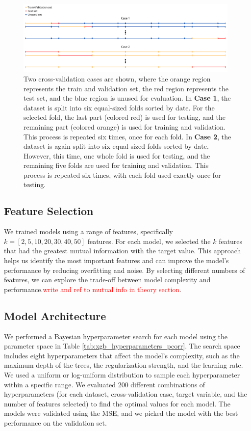\begin{figure}[H]
    \centering
    \includegraphics[width=0.98\textwidth]{Canva/datasplits.png}
    \caption{Two cross-validation cases are shown, where the orange region represents the train and validation set, the red region represents the test set, and the blue region is unused for evaluation.
    In \textbf{Case 1}, the dataset is split into six equal-sized folds sorted by date.
    For the selected fold, the last part (colored red) is used for testing, and the remaining part (colored orange) is used for training and validation.
    This process is repeated six times, once for each fold.
    In \textbf{Case 2}, the dataset is again split into six equal-sized folds sorted by date.
    However, this time, one whole fold is used for testing, and the remaining five folds are used for training and validation.
    This process is repeated six times, with each fold used exactly once for testing.}
    \label{fig:datasplit_cases}
\end{figure}




\subsection{Feature Selection}
We trained models using a range of features, specifically $k=[2,5,10,20,30,40,50]$ features.
For each model, we selected the $k$ features that had the greatest mutual information with the target value.
This approach helps us identify the most important features and can improve the model's performance by reducing overfitting and noise.
By selecting different numbers of features, we can explore the trade-off between model complexity and performance.\textcolor{red}{write and ref to mutual info in theory section}.

\subsection{Model Architecture}
We performed a Bayesian hyperparameter search for each model using the parameter space in Table \ref{tab:xgb_hyperparameters_pcorr}.
The search space includes eight hyperparameters that affect the model's complexity, such as the maximum depth of the trees, the regularization strength, and the learning rate.
We used a uniform or log-uniform distribution to sample each hyperparameter within a specific range.
We evaluated $200$ different combinations of hyperparameters (for each dataset, cross-validation case, target variable, and the number of features selected) to find the optimal values for each model.
The models were validated using the MSE, and we picked the model with the best performance on the validation set.


